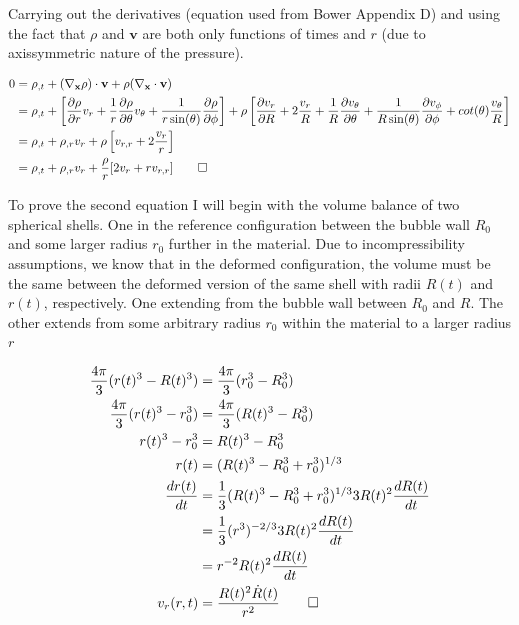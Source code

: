 Carrying out the derivatives (equation used from Bower Appendix D) and using the fact that $\rho$ and $\mathbf{v}$ are both only functions of times and $r$ (due to axissymmetric nature of the pressure). 


\begin{align*}
    0 &= \rho_{,t} + (\nabla_\mathbf{x}\rho) \cdot \mathbf{v} + \rho(\nabla_{\mathbf{x}}\cdot\mathbf{v}) \\
    &= \rho_{,t} + \left[\frac{\partial\rho}{\partial r}v_r +\frac{1}{r}\frac{\partial\rho}{\partial \theta}v_\theta+\frac{1}{r\sin(\theta)}\frac{\partial\rho}{\partial \phi}\right] + \rho\left[\frac{\partial v_r}{\partial R} + 2\frac{v_r}{R}+\frac{1}{R}\frac{\partial v_\theta}{\partial \theta} + \frac{1}{R\sin(\theta)}\frac{\partial v_\phi}{\partial \phi} + cot(\theta)\frac{v_\theta}{R}\right] \\
    &= \rho_{,t} + \rho_{,r}v_r + \rho\left[v_{r,r}+2\frac{v_r}{r}\right] \\
    &= \rho_{,t} + \rho_{,r}v_r + \frac{\rho}{r}[2v_r + rv_{r,r}] \qed
\end{align*}

To prove the second equation I will begin with the volume balance of two spherical shells. One in the reference configuration between the bubble wall $R_0$ and some larger radius $r_0$ further in the material. Due to incompressibility assumptions, we know that in the deformed configuration, the volume must be the same between the deformed version of the same shell with radii $R(t)$ and $r(t)$, respectively. One extending from the bubble wall between $R_0$ and $R$. The other extends from some arbitrary radius $r_0$ within the material to a larger radius $r$

\begin{align*}
    \frac{4\pi}{3}(r(t)^3-R(t)^3) &= \frac{4\pi}{3}(r_0^3 -R_0^3) \\
     \frac{4\pi}{3}(r(t)^3-r_0^3) &= \frac{4\pi}{3}(R(t)^3 -R_0^3) \\
     r(t)^3-r_0^3 &= R(t)^3 -R_0^3 \\
     r(t) &= (R(t)^3 -R_0^3 + r_0^3)^{1/3} \\
     \frac{dr(t)}{dt} &= \frac{1}{3}(R(t)^3-R_0^3+r_0^3)^{1/3}3R(t)^2\frac{dR(t)}{dt} \\
     &= \frac{1}{3}(r^3)^{-2/3} 3R(t)^2\frac{dR(t)}{dt} \\
     &= r^{-2} R(t)^2\frac{dR(t)}{dt} \\
     v_r(r,t) &= \frac{R(t)^2\dot R(t)}{r^2} \qed \\
\end{align*}

